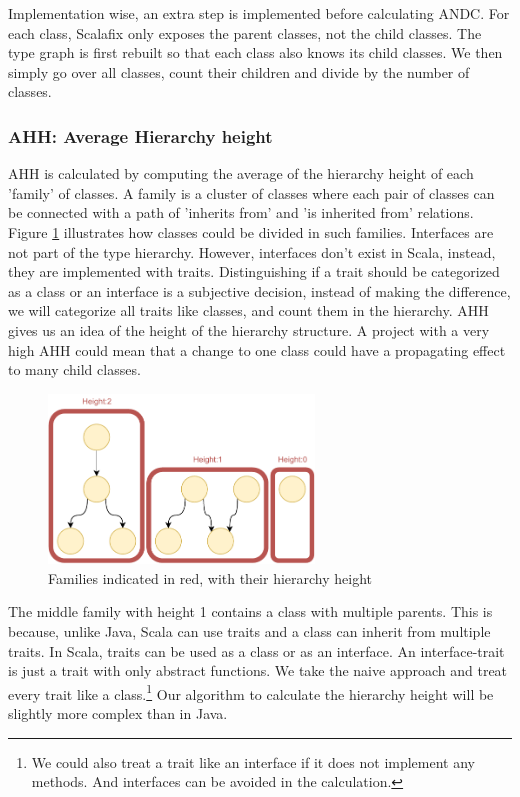 \documentclass[onecolumn]{article}
\begin{document}
Implementation wise, an extra step is implemented before calculating ANDC. For each class, Scalafix only exposes the parent classes, not the child classes. The type graph is first rebuilt so that each class also knows its child classes. We then simply go over all classes, count their children and divide by the number of classes.


\subsubsection{AHH: Average Hierarchy height} \label{overview_pyramid_AHH}
AHH is calculated by computing the average of the hierarchy height of each 'family' of classes. A family is a cluster of classes where each pair of classes can be connected with a path of 'inherits from' and 'is inherited from' relations. Figure \ref{fig:AHH-families} illustrates how classes could be divided in such families. Interfaces are not part of the type hierarchy. However, interfaces don't exist in Scala, instead, they are implemented with traits. Distinguishing if a trait should be categorized as a class or an interface is a subjective decision, instead of making the difference, we will categorize all traits like classes, and count them in the hierarchy. AHH gives us an idea of the height of the hierarchy structure. A project with a very high AHH could mean that a change to one class could have a propagating effect to many child classes. 

\begin{figure}[H]
  \centering
  \includegraphics[width=200pt]{fig/AHH-families.pdf}
  \caption{Families indicated in red, with their hierarchy height}
  \label{fig:AHH-families}
\end{figure}

The middle family with height 1 contains a class with multiple parents. This is because, unlike Java, Scala can use traits and a class can inherit from multiple traits. In Scala, traits can be used as a class or as an interface. An interface-trait is just a trait with only abstract functions. We take the naive approach and treat every trait like a class.\footnote{We could also treat a trait like an interface if it does not implement any methods. And interfaces can be avoided in the calculation.} Our algorithm to calculate the hierarchy height will be slightly more complex than in Java. 
\end{document}

